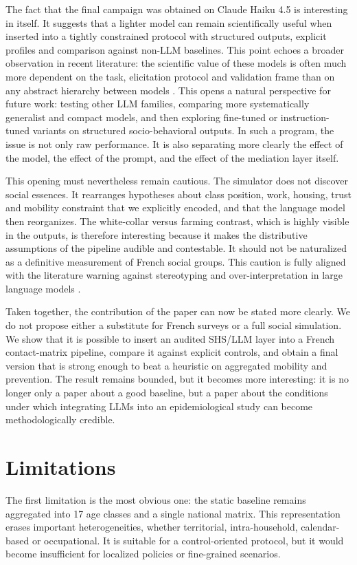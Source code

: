 \documentclass[ROIA,Unicode]{cedram}
\begin{document}
The fact that the final campaign was obtained on Claude Haiku 4.5 is interesting in itself. It suggests that a lighter model can remain scientifically useful when inserted into a tightly constrained protocol with structured outputs, explicit profiles and comparison against non-LLM baselines. This point echoes a broader observation in recent literature: the scientific value of these models is often much more dependent on the task, elicitation protocol and validation frame than on any abstract hierarchy between models \citep{ziems2024css}. This opens a natural perspective for future work: testing other LLM families, comparing more systematically generalist and compact models, and then exploring fine-tuned or instruction-tuned variants on structured socio-behavioral outputs. In such a program, the issue is not only raw performance. It is also separating more clearly the effect of the model, the effect of the prompt, and the effect of the mediation layer itself.

This opening must nevertheless remain cautious. The simulator does not discover social essences. It rearranges hypotheses about class position, work, housing, trust and mobility constraint that we explicitly encoded, and that the language model then reorganizes. The white-collar versus farming contrast, which is highly visible in the outputs, is therefore interesting because it makes the distributive assumptions of the pipeline audible and contestable. It should not be naturalized as a definitive measurement of French social groups. This caution is fully aligned with the literature warning against stereotyping and over-interpretation in large language models \citep{weidinger2022taxonomy,bender2021stochastic}.

Taken together, the contribution of the paper can now be stated more clearly. We do not propose either a substitute for French surveys or a full social simulation. We show that it is possible to insert an audited SHS/LLM layer into a French contact-matrix pipeline, compare it against explicit controls, and obtain a final version that is strong enough to beat a heuristic on aggregated mobility and prevention. The result remains bounded, but it becomes more interesting: it is no longer only a paper about a good baseline, but a paper about the conditions under which integrating LLMs into an epidemiological study can become methodologically credible.

\section{Limitations}
The first limitation is the most obvious one: the static baseline remains aggregated into 17 age classes and a single national matrix. This representation erases important heterogeneities, whether territorial, intra-household, calendar-based or occupational. It is suitable for a control-oriented protocol, but it would become insufficient for localized policies or fine-grained scenarios.
\end{document}
